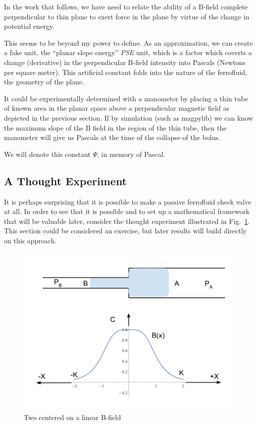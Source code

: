 \documentclass{asme2ej}
\begin{document}
In the work that follows, we have need to relate the ability
of a B-field complete perpendicular to thin plane to exert
force in the plane by virtue of the change in potential energy.

This seems to be beyond my power to define.
As an approximation, we can create a fake unit, the
``planar slope energy'' {\em PSE} unit, which is a factor
which coverts a change (derivative) in the perpendicular B-field intensity
into Pascals (Newtons per square meter).
This artificial constant folds into the nature of the
ferrofluid, the geometry of the plane.

It could be experimentally determined with a manometer
by placing a thin tube of known area in the planar
space above a perpendicular magnetic field
as depicted in the previous section.
If by simulation (such as magpylib) we can know the
maximum slope of the B field in the region of the
thin tube, then the manometer will give us Pascals
at the time of the collapse of the bolus.

We will denote this constant $\Psi$, in memory of Pascal.



\subsection{ A Thought Experiment }

It is perhaps surprising that it is possible to make a
passive ferrofluid check valve at all.
In order to see that it is possible and to set up a mathematical
framework that will be valuable later,
consider the thought experiment illustrated in Fig.~\ref{fig:centeredthought}.
This section could be considered an exercise, but
later results will build directly on this approach.


\begin{figure}
\centerline{\includegraphics[width=6in]{figure/ThoughtExperimentCentered.png}}
\caption{Two centered on a  linear B-field}
\label{fig:centeredthought}
\end{figure}
\end{document}
